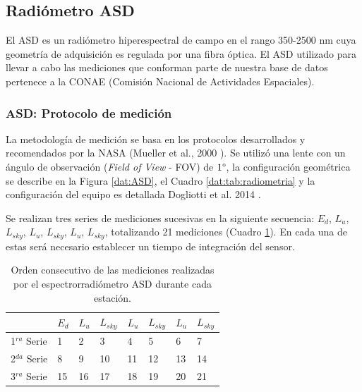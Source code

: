     \subsection{Radiómetro ASD}
    \label{dat:s:asd}
    
        El ASD es un radiómetro hiperespectral de campo en el rango 350-2500 nm cuya geometría de adquisición es regulada por una fibra óptica. El ASD utilizado para llevar a cabo las mediciones que conforman parte de nuestra base de datos pertenece a la CONAE (Comisión Nacional de Actividades Espaciales).

        \subsubsection{ASD: Protocolo de medición}
        \label{dat:s:asdMed}

            La metodología de medición se basa en los protocolos desarrollados y recomendados por la NASA (Mueller et al., 2000 \cite{mueller2003}). Se utilizó una lente con un ángulo de observación (\textit{Field of View} - FOV) de $1 \degree$, la configuración geométrica se describe en la Figura \ref{dat:ASD}, el Cuadro \ref{dat:tab:radiometria} y la configuración del equipo es detallada Dogliotti et al. 2014 \cite{dogliotti2014}.

            Se realizan tres series de mediciones sucesivas en la siguiente secuencia: $E_{d}$, $L_{u}$, $L_{sky}$, $L_{u}$, $L_{sky}$, $L_{u}$, $L_{sky}$, totalizando 21 mediciones (Cuadro \ref{dat:tab:asd}). En cada una de estas será necesario establecer un tiempo de integración del sensor.
            \begin{table}
            \caption{Orden consecutivo de las mediciones realizadas por el espectrorradiómetro ASD durante cada estación.}
                \begin{tabular}{|l|l|l|l|l|l|l|l|}
                \hline
                 & $E_{d}$ & $L_{u}$ & $L_{sky}$ & $L_{u}$ & $L_{sky}$ & $L_{u}$ & $L_{sky}$ \\ \hline
                1$^{ra}$ Serie & 1 & 2 & 3 & 4 & 5 & 6 & 7 \\ \hline
                2$^{da}$ Serie & 8 & 9 & 10 & 11 & 12 & 13 & 14 \\ \hline
                3$^{ra}$ Serie & 15 & 16 & 17 & 18 & 19 & 20 & 21 \\ \hline
                \end{tabular}
            \label{dat:tab:asd}
            \end{table}

